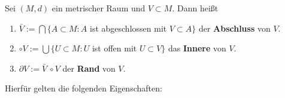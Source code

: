 \begin{definition}
	Sei $(M, d)$ ein metrischer Raum und $V \subset M$. Dann heißt 
	\begin{enumerate}[label=\alph*\upshape)]   
		\item $\bar V := \bigcap \{ A \subset M: A$ ist abgeschlossen mit $V \subset A \} $ der \textbf{Abschluss} von $V$.
		\item $\circ V := \bigcup \{ U \subset M: U$ ist offen mit $U \subset V \}$ das \textbf{Innere} von $V$. %
		\item $ \partial V := \bar V \ \circ V$ der \textbf{Rand} von $V$. %
	\end{enumerate}
\end{definition}

Hierfür gelten die folgenden Eigenschaften:

